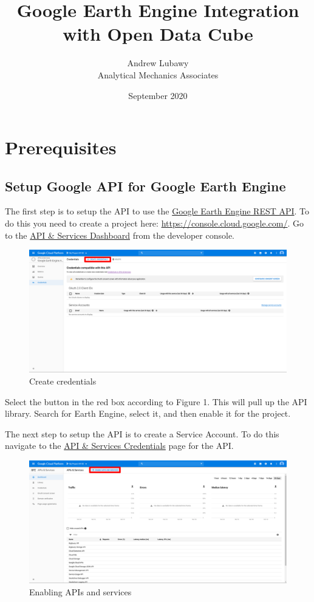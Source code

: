 \documentclass{article}
\title{Google Earth Engine Integration with Open Data Cube}
\author{Andrew Lubawy\\ Analytical Mechanics Associates}
\date{September 2020}
\begin{document}
\maketitle
\tableofcontents

\part{Prerequisites}
\chapter{Setup Google API for Google Earth Engine}
The first step is to setup the API to use the
\href{https://developers.google.com/earth-engine/reference}{Google Earth Engine
REST API}. To do
this you need to create a project here:
\url{https://console.cloud.google.com/}. Go to the
\href{https://console.cloud.google.com/apis/dashboard}{API \& Services
Dashboard}
from the developer console.

\begin{figure}
	\caption{Create credentials}
	\includegraphics{images/image1.png}
\end{figure}

Select the button in the red box according to Figure 1. This will pull up the
API library. Search for Earth Engine, select it, and then enable it for the
project.

The next step to setup the API is to create a Service Account. To do this
navigate to the
\href{https://console.cloud.google.com/apis/api/earthengine.googleapis.com/credentials}{API
\& Services Credentials} page for the API.

\begin{figure}
	\caption{Enabling APIs and services}
	\includegraphics{images/image2.png}
\end{figure}
\end{document}
